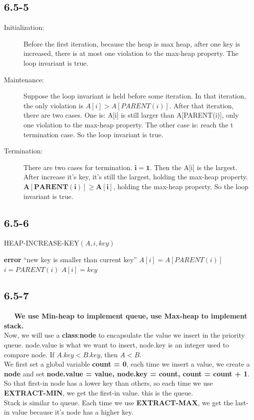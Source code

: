 \documentclass[10pt]{article}
\newcommand*\circled[1]{\tikz[baseline=(char.base)]{
    \node[shape=circle, draw, inner sep=2pt] (char) {#1};}}
\begin{document}
\subsection*{6.5-5}
\begin{description}
\item[Initialization: ]Before the first iteration, because the heap is max heap, after one key is increased, there is at most one violation to the max-heap property. The loop invariant is true.
\item[Maintenance: ] Suppose the loop invariant is held before some iteration. In that iteration, the only violation is $A[i] > A[PARENT(i)]$. After that iteration, there are two cases. One is: A[i] is still larger than A[PARENT(i)], only one violation to the max-heap property. The other case is: reach the t termination case. So the loop invariant is true.
\item[Termination: ]There are two cases for termination. \circled{1}$\mathbf{i = 1}$. Then the A[i] is the largest. After increase it's key, it's still the largest, holding the max-heap property. \circled{2}$\mathbf{A[PARENT(i)] \ge A[i]}$, holding the max-heap property. So the loop invariant is true.
\end{description}
\newpage
\subsection*{6.5-6}
\begin{algorithm}
\caption{HEAP-INCREASE-KEY$(A, i, key)$}
\begin{algorithmic}[1]
\STATE \textbf{error} ``new key is smaller than current key''
\ENDIF
{}
\STATE $A[i] = A[PARENT(i)]$
\STATE $i = PARENT(i)$
\ENDWHILE
\STATE $A[i] = key$
\end{algorithmic}
\end{algorithm}


\subsection*{6.5-7}
~~~\textbf{We use Min-heap to implement queue, use Max-heap to implement stack.}\\
\indent Now, we will use a \textbf{class}:\textbf{node} to encapsulate the value we insert in the priority queue. node.value is what we want to insert, node.key is an integer used to compare node. If $A.key < B.key$, then $A < B$.\\
\indent We first set a global variable \textbf{count = 0}, each time we insert a value, we create a \textbf{node} and set \textbf{node.value = value, node.key = count, count = count + 1}. So that first-in node has a lower key than others, so each time we use \textbf{EXTRACT-MIN}, we get the first-in value. this is the queue.\\
\indent Stack is similar to queue. Each time we use \textbf{EXTRACT-MAX}, we get the last-in value because it's node has a higher key.
\end{document}
